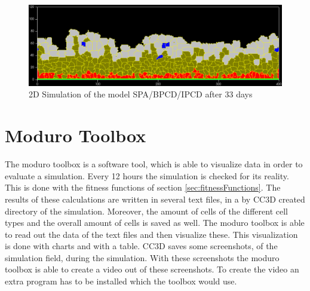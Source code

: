 \begin{figure}
	\center
	\includegraphics[scale=0.35]{figures/2DSimulation-33Days.png}
	\caption{2D Simulation of the model SPA/BPCD/IPCD after 33 days}
	\label{img:2DSimulation33Days}
\end{figure}

\section{Moduro Toolbox}
The moduro toolbox is a software tool, which is able to visualize data in order to evaluate a simulation. \newline
Every 12 hours the simulation is checked for its reality. This is done with the fitness functions of section \ref{sec:fitnessFunctions}. The results of these calculations are written in several text files, in a by \ac{CC3D} created directory of the simulation. Moreover, the amount of cells of the different cell types and the overall amount of cells is saved as well. The moduro toolbox is able to read out the data of the text files and then visualize these. This visualization is done with charts and with a table. \newline
\ac{CC3D} saves some screenshots, of the simulation field, during the simulation. With these screenshots the moduro toolbox is able to create a video out of these screenshots. To create the video an extra program has to be installed which the toolbox would use.


